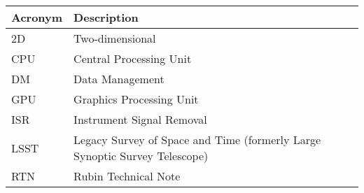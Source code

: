 \addtocounter{table}{-1}
\begin{longtable}{p{}p{}}\hline
\textbf{Acronym} & \textbf{Description}  \\\hline

2D & Two-dimensional \\\hline
CPU & Central Processing Unit \\\hline
DM & Data Management \\\hline
GPU & Graphics Processing Unit \\\hline
ISR & Instrument Signal Removal \\\hline
LSST & Legacy Survey of Space and Time (formerly Large Synoptic Survey Telescope) \\\hline
RTN & Rubin Technical Note \\\hline
\end{longtable}
